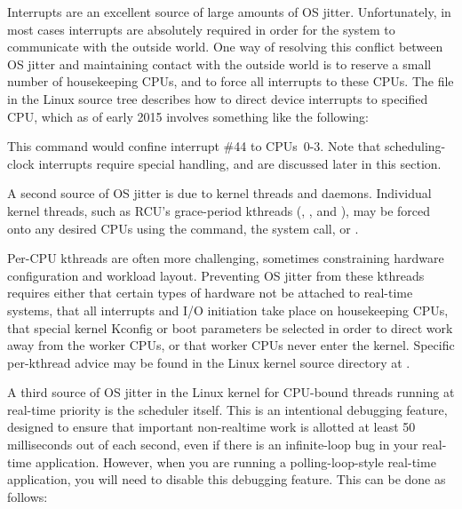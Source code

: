 Interrupts are an excellent source of large amounts of OS jitter.
Unfortunately, in most cases interrupts are absolutely required in order
for the system to communicate with the outside world.
One way of resolving this conflict between OS jitter and maintaining
contact with the outside world is to reserve a small number of
housekeeping CPUs, and to force all interrupts to these CPUs.
The  file in the Linux source tree
describes how to direct device interrupts to specified CPU,
which as of early 2015 involves something like the following:

\begin{quote}
	\scriptsize
\end{quote}

This command would confine interrupt \#44 to CPUs~0-3.
Note that scheduling-clock interrupts require special handling, and are
discussed later in this section.

A second source of OS jitter is due to kernel threads and daemons.
Individual kernel threads, such as RCU's grace-period kthreads
(, , and ), may be forced
onto any desired CPUs using the  command, the
 system call, or .

Per-CPU kthreads are often more challenging, sometimes constraining
hardware configuration and workload layout.
Preventing OS jitter from these kthreads requires either that certain
types of hardware
not be attached to real-time systems, that all interrupts and I/O
initiation take place on housekeeping CPUs, that special kernel
Kconfig or boot parameters be selected in order to direct work away from
the worker CPUs, or that worker CPUs never enter the kernel.
Specific per-kthread advice may be found in the Linux kernel source
 directory at .

A third source of OS jitter in the Linux kernel for CPU-bound threads
running at real-time priority is the scheduler itself.
This is an intentional debugging feature, designed to ensure that
important non-realtime work is allotted at least 50 milliseconds
out of each second, even if there is an infinite-loop bug in
your real-time application.
However, when you are running a polling-loop-style real-time application,
you will need to disable this debugging feature.
This can be done as follows:

{
	\scriptsize
}


